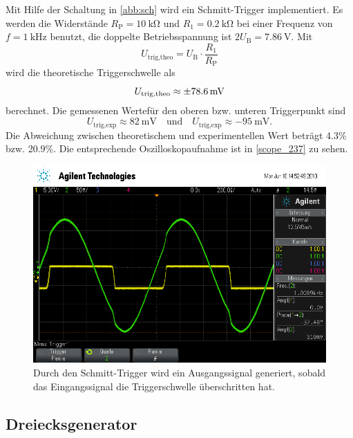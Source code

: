 Mit Hilfe der Schaltung in \autoref{abb:sch} wird ein Schmitt-Trigger implementiert. Es werden die Widerstände $R_\text{P} = \SI{10}{\kilo\ohm}$ und $R_\text{1} = \SI{0.2}{\kilo\ohm}$ bei einer Frequenz von $f = \SI{1}{\kilo\hertz}$ benutzt, die doppelte Betriebsspannung ist $2U_\text{B} = \SI{7.86}{\volt}$. Mit
\begin{equation}
	U_\text{trig,theo} = U_\text{B} \cdot \frac{R_1}{R_\text{P}}
\end{equation}
wird die theoretische Triggerschwelle als
\begin{equation*}
	U_\text{trig,theo} \approx \SI{\pm 78.6}{\milli\volt}
\end{equation*}
berechnet. Die gemessenen Wertefür den oberen bzw. unteren Triggerpunkt sind
\begin{equation*}
	U_\text{trig,exp} \approx \SI{82}{\milli\volt} \quad \text{und} \quad U_\text{trig,exp} \approx \SI{-95}{\milli\volt}.
\end{equation*}
Die Abweichung zwischen theoretischem und experimentellen Wert beträgt 4.3\% bzw. 20.9\%. Die entsprechende Oszilloskopaufnahme ist in \autoref{scope_237} zu sehen.
\begin{figure}[h]
	\centering
	\includegraphics[width=\textwidth]{usb/scope_237.png}
	\caption{Durch den Schmitt-Trigger wird ein Ausgangssignal generiert, sobald das Eingangssignal die Triggerschwelle überschritten hat.}
	\label{scope_237}
\end{figure}

\FloatBarrier

\subsection{Dreiecksgenerator}


